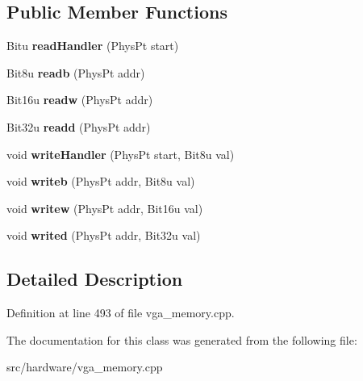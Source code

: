 \subsection*{Public Member Functions}
\begin{DoxyCompactItemize}
\item 
\hypertarget{classVGA__UnchainedVGA__Handler_a5de9a4081506d1b355ee928fa4e31201}{Bitu {\bfseries read\-Handler} (Phys\-Pt start)}\label{classVGA__UnchainedVGA__Handler_a5de9a4081506d1b355ee928fa4e31201}

\item 
\hypertarget{classVGA__UnchainedVGA__Handler_a2a9b156a0b7964f47a0903470b75f245}{Bit8u {\bfseries readb} (Phys\-Pt addr)}\label{classVGA__UnchainedVGA__Handler_a2a9b156a0b7964f47a0903470b75f245}

\item 
\hypertarget{classVGA__UnchainedVGA__Handler_ae6fa9f23f827f805fc94185b2eded25c}{Bit16u {\bfseries readw} (Phys\-Pt addr)}\label{classVGA__UnchainedVGA__Handler_ae6fa9f23f827f805fc94185b2eded25c}

\item 
\hypertarget{classVGA__UnchainedVGA__Handler_a5ffd0e7cb069590a33fbb478b79b1380}{Bit32u {\bfseries readd} (Phys\-Pt addr)}\label{classVGA__UnchainedVGA__Handler_a5ffd0e7cb069590a33fbb478b79b1380}

\item 
\hypertarget{classVGA__UnchainedVGA__Handler_a2ff44c0c054b1aa0697374ae2fca666a}{void {\bfseries write\-Handler} (Phys\-Pt start, Bit8u val)}\label{classVGA__UnchainedVGA__Handler_a2ff44c0c054b1aa0697374ae2fca666a}

\item 
\hypertarget{classVGA__UnchainedVGA__Handler_a6c1fa72909d6d784980f88e560a945f6}{void {\bfseries writeb} (Phys\-Pt addr, Bit8u val)}\label{classVGA__UnchainedVGA__Handler_a6c1fa72909d6d784980f88e560a945f6}

\item 
\hypertarget{classVGA__UnchainedVGA__Handler_ad49414bf345e6806ecf02b5740cd5022}{void {\bfseries writew} (Phys\-Pt addr, Bit16u val)}\label{classVGA__UnchainedVGA__Handler_ad49414bf345e6806ecf02b5740cd5022}

\item 
\hypertarget{classVGA__UnchainedVGA__Handler_aa10072aef1761c10487ee5b97d1b1af2}{void {\bfseries writed} (Phys\-Pt addr, Bit32u val)}\label{classVGA__UnchainedVGA__Handler_aa10072aef1761c10487ee5b97d1b1af2}

\end{DoxyCompactItemize}


\subsection{Detailed Description}


Definition at line 493 of file vga\-\_\-memory.\-cpp.



The documentation for this class was generated from the following file\-:\begin{DoxyCompactItemize}
\item 
src/hardware/vga\-\_\-memory.\-cpp\end{DoxyCompactItemize}
